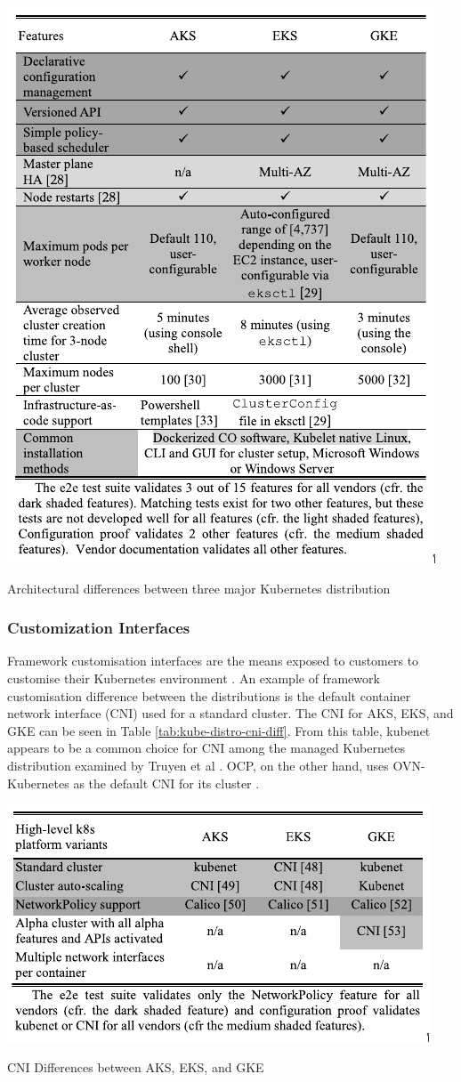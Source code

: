 \begin{table}
    \centering
    \includegraphics[width=0.6\linewidth]{resources/Pasted image 20241123075148.png}
    \caption{Architectural differences between three major Kubernetes distribution \cite{truyenManagingFeatureCompatibility2020}}
    \label{tab:architecture-diff-k8s-distro}
\end{table}

\FloatBarrier



\subsubsection{Customization Interfaces}



Framework customisation interfaces are the means exposed to customers to customise their Kubernetes environment \cite{truyenManagingFeatureCompatibility2020}. An example of framework customisation difference between the distributions is the default container network interface (CNI) used for a standard cluster. The CNI for AKS, EKS, and GKE can be seen in Table \ref{tab:kube-distro-cni-diff}. From this table, kubenet appears to be a common choice for CNI among the managed Kubernetes distribution examined by Truyen et al \cite{truyenManagingFeatureCompatibility2020}. OCP, on the other hand, uses OVN-Kubernetes as the default CNI for its cluster \cite{Chapter23OVNKubernetes}.


\begin{table}
    \centering
    \includegraphics[width=0.6\linewidth]{resources/Pasted image 20241123082858.png}
    \caption{CNI Differences between AKS, EKS, and GKE \cite{truyenManagingFeatureCompatibility2020}}
    \label{tab:kube-distro-cni-diff}
\end{table}

